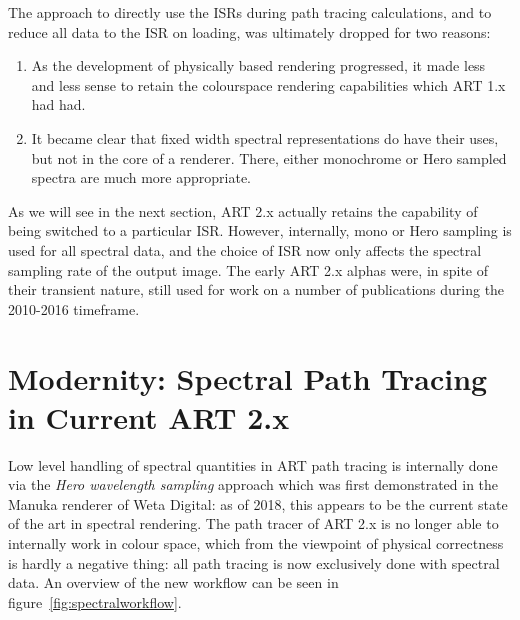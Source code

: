 The approach to directly use the ISRs during path tracing calculations, and to reduce all data to the ISR on loading, was ultimately dropped for two reasons:

\begin{enumerate}
\item As the development of physically based rendering progressed, it made less and less sense to retain the colourspace rendering capabilities which ART 1.x had had.
\item It became clear that fixed width spectral representations do have their uses, but not in the core of a renderer. There, either monochrome or Hero sampled spectra are much more appropriate.
\end{enumerate}

As we will see in the next section, ART 2.x actually retains the capability of being switched to a particular ISR. However, internally, mono or Hero sampling is used for all spectral data, and the choice of ISR now only affects the spectral sampling rate of the output image. The early ART 2.x alphas were, in spite of their transient nature, still used for work on a number of publications during the 2010-2016 timeframe. 

\section{Modernity: Spectral Path Tracing in Current ART 2.x}
\label{sect:currentart}

Low level handling of spectral quantities in ART path tracing is internally done via the \emph{Hero wavelength sampling} approach which was first demonstrated in the Manuka renderer of Weta Digital: as of 2018, this appears to be the current state of the art in spectral rendering. The path tracer of ART 2.x is no longer able to internally work in colour space, which from the viewpoint of physical correctness is hardly a negative thing: all path tracing is now exclusively done with spectral data. An overview of the new workflow can be seen in figure~\ref{fig:spectralworkflow}.

